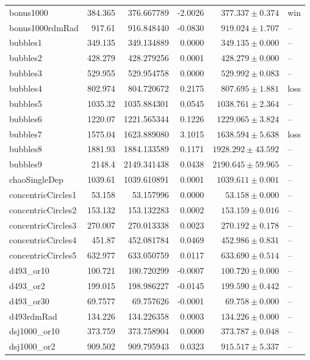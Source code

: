 \documentclass[11pt]{article}
\begin{document}
\begin{longtable}{lrrrrl}
\hline
\endlastfoot
bonus1000 & 384.365 & 376.667789 & -2.0026 & $377.337 \pm 0.374$ & win \\
bonus1000rdmRad & 917.61 & 916.848440 & -0.0830 & $919.024 \pm 1.707$ & -- \\
bubbles1 & 349.135 & 349.134889 & 0.0000 & $349.135 \pm 0.000$ & -- \\
bubbles2 & 428.279 & 428.279256 & 0.0001 & $428.279 \pm 0.000$ & -- \\
bubbles3 & 529.955 & 529.954758 & 0.0000 & $529.992 \pm 0.083$ & -- \\
bubbles4 & 802.974 & 804.720672 & 0.2175 & $807.695 \pm 1.881$ & loss \\
bubbles5 & 1035.32 & 1035.884301 & 0.0545 & $1038.761 \pm 2.364$ & -- \\
bubbles6 & 1220.07 & 1221.565344 & 0.1226 & $1229.065 \pm 3.824$ & -- \\
bubbles7 & 1575.04 & 1623.889080 & 3.1015 & $1638.594 \pm 5.638$ & loss \\
bubbles8 & 1881.93 & 1884.133589 & 0.1171 & $1928.292 \pm 43.592$ & -- \\
bubbles9 & 2148.4 & 2149.341438 & 0.0438 & $2190.645 \pm 59.965$ & -- \\
chaoSingleDep & 1039.61 & 1039.610891 & 0.0001 & $1039.611 \pm 0.001$ & -- \\
concentricCircles1 & 53.158 & 53.157996 & 0.0000 & $53.158 \pm 0.000$ & -- \\
concentricCircles2 & 153.132 & 153.132283 & 0.0002 & $153.159 \pm 0.016$ & -- \\
concentricCircles3 & 270.007 & 270.013338 & 0.0023 & $270.192 \pm 0.178$ & -- \\
concentricCircles4 & 451.87 & 452.081784 & 0.0469 & $452.986 \pm 0.831$ & -- \\
concentricCircles5 & 632.977 & 633.050759 & 0.0117 & $633.690 \pm 0.514$ & -- \\
d493\_or10 & 100.721 & 100.720299 & -0.0007 & $100.720 \pm 0.000$ & -- \\
d493\_or2 & 199.015 & 198.986227 & -0.0145 & $199.590 \pm 0.442$ & -- \\
d493\_or30 & 69.7577 & 69.757626 & -0.0001 & $69.758 \pm 0.000$ & -- \\
d493rdmRad & 134.226 & 134.226358 & 0.0003 & $134.226 \pm 0.000$ & -- \\
dsj1000\_or10 & 373.759 & 373.758904 & 0.0000 & $373.787 \pm 0.048$ & -- \\
dsj1000\_or2 & 909.502 & 909.795943 & 0.0323 & $915.517 \pm 5.337$ & -- \\

\end{longtable}
\end{document}
